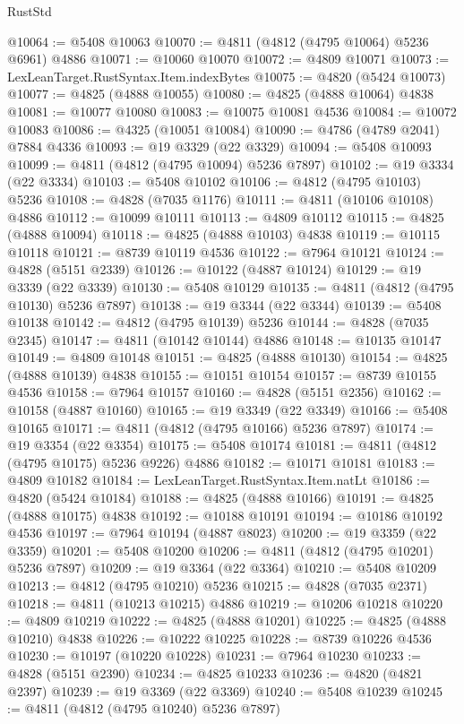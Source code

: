 \begin{lexlean}{RustStd}
\begin{coremodule}
{\begin{coremodule}
{{{{{{{{{{{{{{{{{{{{{{{{{{{{{{{{{{{{{{{{{{{{{{{{{{{{{{{{{{{{{{{{{{{{{{{{{{{{{{{{@10064 := @5408 @10063
@10070 := @4811 (@4812 (@4795 @10064) @5236 @6961) @4886
@10071 := @10060 @10070
@10072 := @4809 @10071
@10073 := LexLeanTarget.RustSyntax.Item.indexBytes
@10075 := @4820 (@5424 @10073)
@10077 := @4825 (@4888 @10055)
@10080 := @4825 (@4888 @10064) @4838
@10081 := @10077 @10080
@10083 := @10075 @10081 @4536
@10084 := @10072 @10083
@10086 := @4325 (@10051 @10084)
@10090 := @4786 (@4789 @2041) @7884 @4336
@10093 := @19 @3329 (@22 @3329)
@10094 := @5408 @10093
@10099 := @4811 (@4812 (@4795 @10094) @5236 @7897)
@10102 := @19 @3334 (@22 @3334)
@10103 := @5408 @10102
@10106 := @4812 (@4795 @10103) @5236
@10108 := @4828 (@7035 @1176)
@10111 := @4811 (@10106 @10108) @4886
@10112 := @10099 @10111
@10113 := @4809 @10112
@10115 := @4825 (@4888 @10094)
@10118 := @4825 (@4888 @10103) @4838
@10119 := @10115 @10118
@10121 := @8739 @10119 @4536
@10122 := @7964 @10121
@10124 := @4828 (@5151 @2339)
@10126 := @10122 (@4887 @10124)
@10129 := @19 @3339 (@22 @3339)
@10130 := @5408 @10129
@10135 := @4811 (@4812 (@4795 @10130) @5236 @7897)
@10138 := @19 @3344 (@22 @3344)
@10139 := @5408 @10138
@10142 := @4812 (@4795 @10139) @5236
@10144 := @4828 (@7035 @2345)
@10147 := @4811 (@10142 @10144) @4886
@10148 := @10135 @10147
@10149 := @4809 @10148
@10151 := @4825 (@4888 @10130)
@10154 := @4825 (@4888 @10139) @4838
@10155 := @10151 @10154
@10157 := @8739 @10155 @4536
@10158 := @7964 @10157
@10160 := @4828 (@5151 @2356)
@10162 := @10158 (@4887 @10160)
@10165 := @19 @3349 (@22 @3349)
@10166 := @5408 @10165
@10171 := @4811 (@4812 (@4795 @10166) @5236 @7897)
@10174 := @19 @3354 (@22 @3354)
@10175 := @5408 @10174
@10181 := @4811 (@4812 (@4795 @10175) @5236 @9226) @4886
@10182 := @10171 @10181
@10183 := @4809 @10182
@10184 := LexLeanTarget.RustSyntax.Item.natLt
@10186 := @4820 (@5424 @10184)
@10188 := @4825 (@4888 @10166)
@10191 := @4825 (@4888 @10175) @4838
@10192 := @10188 @10191
@10194 := @10186 @10192 @4536
@10197 := @7964 @10194 (@4887 @8023)
@10200 := @19 @3359 (@22 @3359)
@10201 := @5408 @10200
@10206 := @4811 (@4812 (@4795 @10201) @5236 @7897)
@10209 := @19 @3364 (@22 @3364)
@10210 := @5408 @10209
@10213 := @4812 (@4795 @10210) @5236
@10215 := @4828 (@7035 @2371)
@10218 := @4811 (@10213 @10215) @4886
@10219 := @10206 @10218
@10220 := @4809 @10219
@10222 := @4825 (@4888 @10201)
@10225 := @4825 (@4888 @10210) @4838
@10226 := @10222 @10225
@10228 := @8739 @10226 @4536
@10230 := @10197 (@10220 @10228)
@10231 := @7964 @10230
@10233 := @4828 (@5151 @2390)
@10234 := @4825 @10233
@10236 := @4820 (@4821 @2397)
@10239 := @19 @3369 (@22 @3369)
@10240 := @5408 @10239
@10245 := @4811 (@4812 (@4795 @10240) @5236 @7897)
}}}}}}}}}}}}}}}}}}}}}}}}}}}}}}}}}}}}}}}}}}}}}}}}}}}}}}}}}}}}}}}}}}}}}}}}}}}}}}}}
\end{coremodule}}
\end{coremodule}
\end{lexlean}
